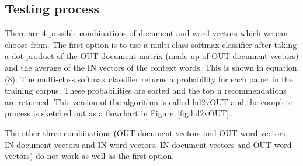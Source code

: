 \subsection{Testing process}
There are 4 possible combinations of document and word vectors which we can choose from. The first option is to use a multi-class softmax classifier after taking a dot product of the OUT document matrix (made up of OUT document vectors) and the average of the IN vectors of the context words. This is shown in equation (8). The multi-class softmax classifier returns a probability for each paper in the training corpus. These probabilities are sorted and the top n recommendations are returned. This version of the algorithm is called hd2vOUT and the complete process is sketched out as a flowchart in Figure~\ref{fig:hd2vOUT}.

The other three combinations (OUT document vectors and OUT word vectors, IN document vectors and IN word vectors, IN document vectors and OUT word vectors) do not work as well as the first option. 

